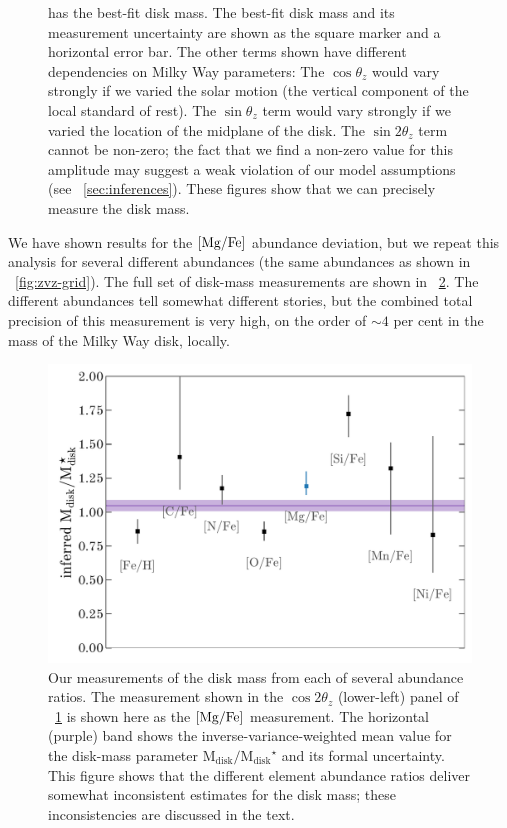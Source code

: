 \documentclass[modern]{aastex63}
\newcommand{\mdisk}{\ensuremath{\mathrm{M}_\mathrm{disk}}}
\newcommand{\mratio}{\ensuremath{\mdisk / \mdisk^\star}}
\begin{document}
\begin{figure}[!tp]
{    has the best-fit disk mass.
    The best-fit disk mass and its measurement uncertainty are shown as the
    square marker and a horizontal error bar.
    The other terms shown have different dependencies on Milky Way parameters:
    The $\cos\theta_z$ would vary strongly if we varied the solar motion (the
    vertical component of the local standard of rest).
    The $\sin\theta_z$ term would vary strongly if we varied the location of the
    midplane of the disk.
    The $\sin 2\theta_z$ term cannot be non-zero; the fact that we find a
    non-zero value for this amplitude may suggest a weak violation of our model
    assumptions (see \sectionname~\ref{sec:inferences}).
    These figures show that we can precisely measure the disk mass.
  \label{fig:coeff-mdisk}
  }
\end{figure}

We have shown results for the ${[\mathrm{Mg}/\mathrm{Fe}]}$ abundance deviation, but we repeat this
analysis for several different abundances (the same abundances as shown in
\figurename~\ref{fig:zvz-grid}).
The full set of disk-mass measurements are shown in
\figurename~\ref{fig:inferred-mdisk-elems}.
The different abundances tell somewhat different stories, but the combined total
precision of this measurement is very high, on the order of $\sim 4$ per cent in
the mass of the Milky Way disk, locally.

\begin{figure}[!tp]
  \begin{center}
  \includegraphics[width=\textwidth]{mdisk-vs-elem.pdf}
  \end{center}
  \caption{%
    Our measurements of the disk mass from each of several abundance ratios.
    The measurement shown in the $\cos 2\theta_z$ (lower-left) panel of
    \figurename~\ref{fig:coeff-mdisk} is shown here as the ${[\mathrm{Mg}/\mathrm{Fe}]}$ measurement.
    The horizontal (purple) band shows the inverse-variance-weighted mean value
    for the disk-mass parameter $\mratio$ and its formal uncertainty.
    This figure shows that the different element abundance ratios deliver
    somewhat inconsistent estimates for the disk mass; these inconsistencies are
    discussed in the text.
  \label{fig:inferred-mdisk-elems}
  }
\end{figure}
\end{document}
